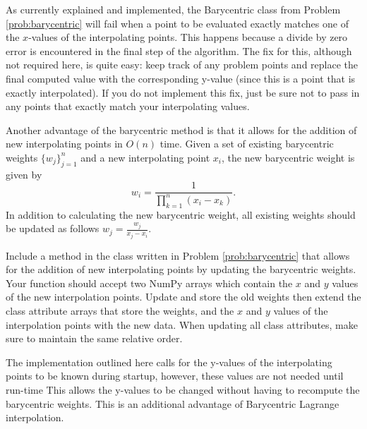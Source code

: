 \begin{warn}
As currently explained and implemented, the Barycentric class from Problem \ref{prob:barycentric} will fail when a point to be evaluated exactly matches one of the $x$-values of the interpolating points.
This happens because a divide by zero error is encountered in the final step of the algorithm.
The fix for this, although not required here, is quite easy: keep track of any problem points and replace the final computed value with the corresponding y-value (since this is a point that is exactly interpolated).
If you do not implement this fix, just be sure not to pass in any points that exactly match your interpolating values.
\end{warn}

Another advantage of the barycentric method is that it allows for the addition of new interpolating points in $O(n)$ time.
Given a set of existing barycentric weights $\{ w_j\}_{j=1}^n$ and a new interpolating point $x_i$, the new barycentric weight is given by
\[
w_i = \frac{1}{\prod_{k=1}^n (x_i-x_k)}.
\]
In addition to calculating the new barycentric weight, all existing weights should be updated as follows $w_j=\frac{w_j}{x_j-x_i}$.

\begin{problem}
\label{prob:add weights}
Include a method in the class written in Problem \ref{prob:barycentric} that allows for the addition of new interpolating points by updating the barycentric weights.
Your function should accept two NumPy arrays which contain the $x$ and $y$ values of the new interpolation points.
Update and store the old weights then extend the class attribute arrays that store the weights, and the $x$ and $y$ values of the interpolation points with the new data.
When updating all class attributes, make sure to maintain the same relative order.
\end{problem}

The implementation outlined here calls for the y-values of the interpolating points to be known during startup, however, these values are not needed until run-time
This allows the y-values to be changed without having to recompute the barycentric weights.
This is an additional advantage of Barycentric Lagrange interpolation.

